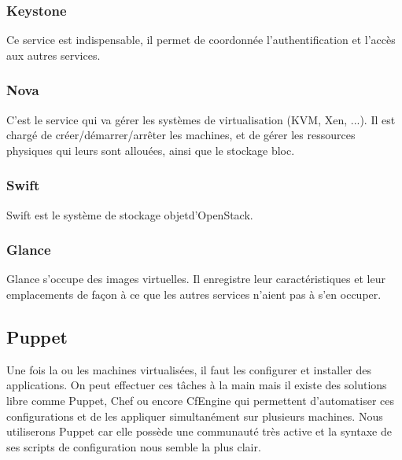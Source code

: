 \documentclass{report}
\begin{document}
\subsubsection{Keystone}
Ce service est indispensable, il permet de coordonnée l'authentification et l'accès aux autres services.

\subsubsection{Nova}
C'est le service qui va gérer les systèmes de virtualisation (KVM, Xen, ...). Il est chargé de créer/démarrer/arrêter les machines, et de gérer les ressources physiques qui leurs sont allouées, ainsi que le stockage bloc\footnotemark[2].

\subsubsection{Swift}
Swift est le système de stockage objet\footnotemark[3] d'OpenStack.

\subsubsection{Glance}
Glance s'occupe des images virtuelles\footnotemark[4]. Il enregistre leur caractéristiques et leur emplacements de façon à ce que les autres services n'aient pas à s'en occuper.


\newpage
\subsection{Puppet}
Une fois la ou les machines virtualisées, il faut les configurer et installer des applications. On peut effectuer ces tâches à la main mais il existe des solutions libre comme Puppet, Chef ou encore CfEngine qui permettent d'automatiser ces configurations et de les appliquer simultanément sur plusieurs machines. Nous utiliserons Puppet car elle possède une communauté très active et la syntaxe de ses scripts de configuration nous semble la plus clair.
\end{document}
